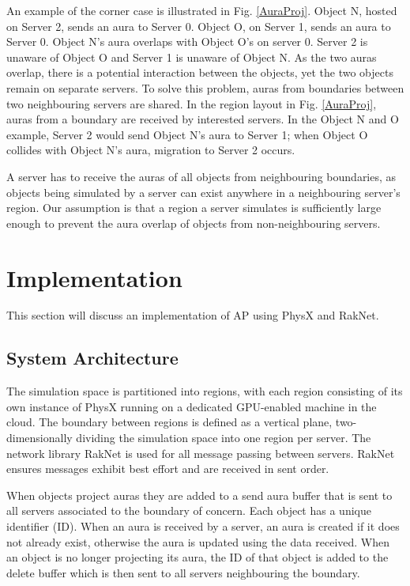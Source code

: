 An example of the corner case is illustrated in Fig. \ref{AuraProj}. Object N, hosted on Server 2, sends an aura to Server 0. Object O, on Server 1, sends an aura to Server 0. Object N's aura overlaps with Object O's on server 0. Server 2 is unaware of Object O and Server 1 is unaware of Object N. As the two auras overlap, there is a potential interaction between the objects, yet the two objects remain on separate servers. To solve this problem, auras from boundaries between two neighbouring servers are shared. In the region layout in Fig. \ref{AuraProj}, auras from a boundary are received by interested servers. In the Object N and O example, Server 2 would send Object N's aura to Server 1; when Object O collides with Object N's aura, migration to Server 2 occurs.

A server has to receive the auras of all objects from neighbouring boundaries, as objects being simulated by a server can exist anywhere in a neighbouring server's region. Our assumption is that a region a server simulates is sufficiently large enough to prevent the aura overlap of objects from non-neighbouring servers.

\chapter{Implementation}
This section will discuss an implementation of AP using PhysX and RakNet.

\section{System Architecture}
The simulation space is partitioned into regions, with each region consisting of its own instance of PhysX running on a dedicated GPU-enabled machine in the cloud. The boundary between regions is defined as a vertical plane, two-dimensionally dividing the simulation space into one region per server. The network library RakNet is used for all message passing between servers. RakNet ensures messages exhibit best effort and are received in sent order.

When objects project auras they are added to a send aura buffer that is sent to all servers associated to the boundary of concern. Each object has a unique identifier (ID). When an aura is received by a server, an aura is created if it does not already exist, otherwise the aura is updated using the data received. When an object is no longer projecting its aura, the ID of that object is added to the delete buffer which is then sent to all servers neighbouring the boundary.

